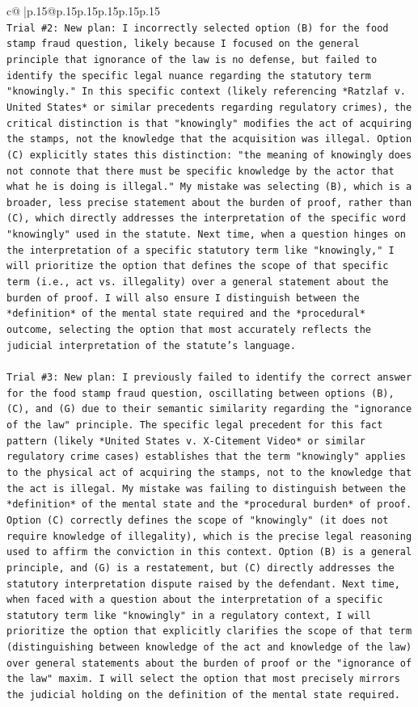 \documentclass{article}
\begin{document}
{\begin{supertabular}{c@{$\;$}|p{.15\linewidth}@{}p{.15\linewidth}p{.15\linewidth}p{.15\linewidth}p{.15\linewidth}p{.15\linewidth}}
{{{\\ 
\texttt{Trial \#2: New plan: I incorrectly selected option (B) for the food stamp fraud question, likely because I focused on the general principle that ignorance of the law is no defense, but failed to identify the specific legal nuance regarding the statutory term "knowingly." In this specific context (likely referencing *Ratzlaf v. United States* or similar precedents regarding regulatory crimes), the critical distinction is that "knowingly" modifies the act of acquiring the stamps, not the knowledge that the acquisition was illegal. Option (C) explicitly states this distinction: "the meaning of knowingly does not connote that there must be specific knowledge by the actor that what he is doing is illegal." My mistake was selecting (B), which is a broader, less precise statement about the burden of proof, rather than (C), which directly addresses the interpretation of the specific word "knowingly" used in the statute. Next time, when a question hinges on the interpretation of a specific statutory term like "knowingly," I will prioritize the option that defines the scope of that specific term (i.e., act vs. illegality) over a general statement about the burden of proof. I will also ensure I distinguish between the *definition* of the mental state required and the *procedural* outcome, selecting the option that most accurately reflects the judicial interpretation of the statute's language.} \\
\\ 
\texttt{Trial \#3: New plan: I previously failed to identify the correct answer for the food stamp fraud question, oscillating between options (B), (C), and (G) due to their semantic similarity regarding the "ignorance of the law" principle. The specific legal precedent for this fact pattern (likely *United States v. X{-}Citement Video* or similar regulatory crime cases) establishes that the term "knowingly" applies to the physical act of acquiring the stamps, not to the knowledge that the act is illegal. My mistake was failing to distinguish between the *definition* of the mental state and the *procedural burden* of proof. Option (C) correctly defines the scope of "knowingly" (it does not require knowledge of illegality), which is the precise legal reasoning used to affirm the conviction in this context. Option (B) is a general principle, and (G) is a restatement, but (C) directly addresses the statutory interpretation dispute raised by the defendant. Next time, when faced with a question about the interpretation of a specific statutory term like "knowingly" in a regulatory context, I will prioritize the option that explicitly clarifies the scope of that term (distinguishing between knowledge of the act and knowledge of the law) over general statements about the burden of proof or the "ignorance of the law" maxim. I will select the option that most precisely mirrors the judicial holding on the definition of the mental state required.} \\
}}}
\end{supertabular}}
\end{document}
